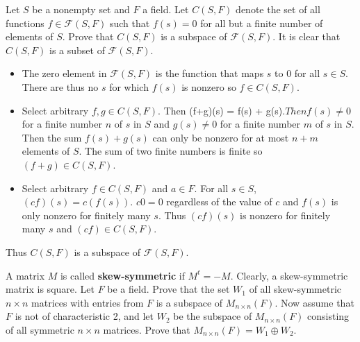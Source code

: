 \documentclass[paper=a4, fontsize=11pt]{jhwhw} %
\begin{document}
            

Let $S$ be a nonempty set and $F$ a field. Let $C(S, F)$ denote the set of all functions $f\in \mathcal{F}(S, F)$ such that $f(s) = 0$ for all but a finite number of elements of $S$. Prove that $C(S, F)$ is a subspace of $\mathcal{F}(S, F)$. 
\solution
It is clear that $C(S, F)$ is a subset of $\mathcal F(S, F)$.
\begin{itemize}
    \item The zero element in $\mathcal F(S, F)$ is the function that maps $s$ to 0 for all $s\in S$. There are thus no $s$ for which $f(s)$ is nonzero so $f\in C(S, F)$. 
    \item Select arbitrary $f, g\in C(S, F)$. Then (f+g)(s) = f(s) + g(s)$. Then f(s) \not= 0$ for a finite number $n$ of $s$ in $S$ and $g(s) \not= 0$ for a finite number $m$ of $s$ in $S$. Then the sum $f(s) + g(s)$ can only be nonzero for at most $n + m$ elements of $S$. The sum of two finite numbers is finite so $(f+g) \in C(S, F)$. 
    \item Select arbitrary $f \in C(S, F)$ and $a\in F$. For all $s\in S$, $(cf)(s) = c(f(s))$. $c0 = 0$ regardless of the value of $c$ and $f(s)$ is only nonzero for finitely many $s$. Thus $(cf)(s)$ is nonzero for finitely many $s$ and $(cf)\in C(S, F)$. 
\end{itemize}
Thus $C(S, F)$ is a subspace of $\mathcal F(S, F)$. 

A matrix $M$ is called \textbf{skew-symmetric} if $M^t = -M$. Clearly, a skew-symmetric matrix is  square. Let $F$ be a field. Prove that the set $W_1$ of all skew-symmetric $n\times n$ matrices with entries from $F$ is a subspace of $M_{n\times n}(F)$. Now assume that $F$ is not of characteristic 2, and let $W_2$ be the subspace of $M_{n\times n}(F)$ consisting of all symmetric $n\times n$ matrices. Prove that $M_{n\times n}(F) = W_1 \oplus W_2$. 
\solution
\end{document}
